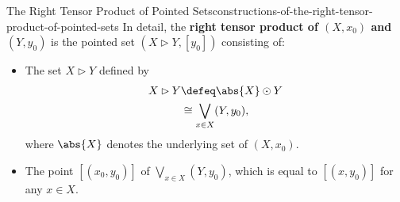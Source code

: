 \begin{construction}{The Right Tensor Product of Pointed Sets}{constructions-of-the-right-tensor-product-of-pointed-sets}%
    In detail, the \textbf{right tensor product of $(X,x_{0})$ and $(Y,y_{0})$} is the pointed set $(X\rhd Y,[y_{0}])$ consisting of:
    \begin{itemize}
        \item{}The set $X\rhd Y$ defined by
            \begin{align*}
                X\rhd Y &\defeq \abs{X}\odot Y\\
                        &\cong  \bigvee_{x\in X}(Y,y_{0}),
            \end{align*}
            where $\abs{X}$ denotes the underlying set of $(X,x_{0})$.
        \item{}The point $[(x_{0},y_{0})]$ of $\bigvee_{x\in X}(Y,y_{0})$, which is equal to $[(x,y_{0})]$ for any $x\in X$.
    \end{itemize}
\end{construction}
